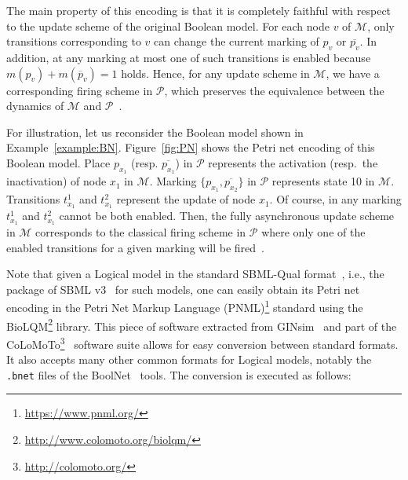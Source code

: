 \documentclass[runningheads]{llncs}
\begin{document}

The main property of this encoding is that it is completely faithful with respect to the update scheme of the original Boolean model.
For each node \(v\) of \(\mathcal{M}\), only transitions corresponding to \(v\) can change the current marking of \(p_v\) or \(\overline{p_v}\).
In addition, at any marking at most one of such transitions is enabled because \(m(p_v) + m(\overline{p}_v) = 1\) holds.
Hence, for any update scheme in \(\mathcal{M}\), we have a corresponding firing scheme in \(\mathcal{P}\), which preserves the equivalence between the dynamics of \(\mathcal{M}\) and \(\mathcal{P}\)~\cite{DBLP:journals/nc/ChatainHKPT20}.

For illustration, let us reconsider the Boolean model shown in Example~\ref{example:BN}.
Figure~\ref{fig:PN} shows the Petri net encoding of this Boolean model.
Place \(p_{x_1}\) (resp. \(\overline{p_{x_1}}\)) in \(\mathcal{P}\) represents the activation (resp.\ the inactivation) of node \(x_1\) in \(\mathcal{M}\).
Marking \(\{p_{x_1}, \overline{p_{x_2}}\}\) in \(\mathcal{P}\) represents state 10 in \(\mathcal{M}\). 
Transitions \(t^{1}_{x_1}\) and \(t^{2}_{x_1}\) represent the update of node \(x_1\).
Of course, in any marking \(t^{1}_{x_1}\) and \(t^{2}_{x_1}\) cannot be both enabled.
Then, the fully asynchronous update scheme in \(\mathcal{M}\) corresponds to the classical firing scheme in \(\mathcal{P}\) where only one of the enabled transitions for a given marking will be fired~\cite{Murata1989}.


Note that given a Logical model in the standard SBML-Qual format~\cite{chaouiya2013sbml}, i.e., the package of SBML v3~\cite{keating2020sbml} for such models, one can easily obtain its Petri net encoding in the Petri Net Markup Language  (PNML)\footnote{\url{https://www.pnml.org/}} standard using the BioLQM\footnote{\url{http://www.colomoto.org/biolqm/}} library.
This piece of software extracted from GINsim~\cite{chaouiya2012logical} and part of the CoLoMoTo\footnote{\url{http://colomoto.org/}}~\cite{naldi2015cooperative} software suite allows for easy conversion between standard formats.
It also accepts many other common formats for Logical models, notably the \verb|.bnet| files of the  BoolNet~\cite{mussel2010boolnet,klarner2017pyboolnet} tools.
The conversion is executed as follows:
\end{document}

